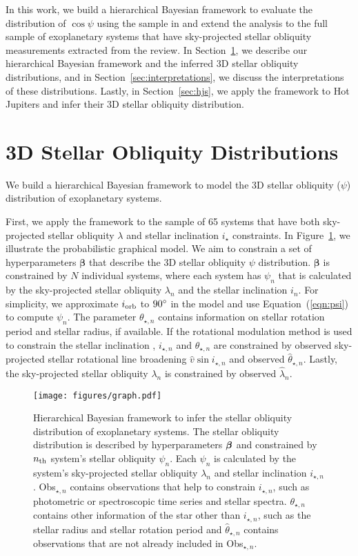 \documentclass[twocolumn,times]{aastex631}
\newcommand{\numistar}{65\xspace}
\begin{document}
In this work, we build a hierarchical Bayesian framework to evaluate the distribution of $\cos{\psi}$ using the sample in \cite{Albrecht21} and extend the analysis to the full sample of exoplanetary systems that have sky-projected stellar obliquity measurements extracted from the \cite{Albrecht22} review.
In Section~\ref{sec:hbm}, we describe our hierarchical Bayesian framework and the inferred 3D stellar obliquity distributions, and in Section~\ref{sec:interpretations}, we discuss the interpretations of these distributions. Lastly, in Section~\ref{sec:hjs}, we apply the framework to Hot Jupiters and infer their 3D stellar obliquity distribution.

\section{3D Stellar Obliquity Distributions} \label{sec:hbm}
We build a hierarchical Bayesian framework to model the 3D stellar obliquity ($\psi$) distribution of exoplanetary systems.

First, we apply the framework to the sample of \numistar systems that have both sky-projected stellar obliquity $\lambda$ and stellar inclination $i_\star$ constraints.
In Figure~\ref{fig:graph}, we illustrate the probabilistic graphical model. We aim to constrain a set of hyperparameters $\bm{\beta}$ that describe the 3D stellar obliquity $\psi$ distribution. $\bm{\beta}$ is constrained by $N$ individual systems, where each system has $\psi_n$ that is calculated by the sky-projected stellar obliquity $\lambda_n$ and the stellar inclination $i_n$. For simplicity, we approximate $i_{\rm orb}$ to $90\mbox{$^\circ$}$ in the model and use Equation~(\ref{eqn:psi}) to compute $\psi_n$. 
The parameter $\theta_{\star, n}$ contains information on stellar rotation period and stellar radius, if available.
If the rotational modulation method is used to constrain the stellar inclination \citep[e.g.,][]{Masuda20}, $i_{\star,n}$ and $\theta_{\star,n}$ are constrained by observed sky-projected stellar rotational line broadening $\hat{v}\sin{i_{\star,n}}$ and observed $\hat{\theta}_{\star,n}$. Lastly, the sky-projected stellar obliquity $\lambda_n$ is constrained by observed $\hat{\lambda}_n$.

\begin{figure}
    \texttt{[image: figures/graph.pdf]}
    \caption{Hierarchical Bayesian framework to infer the stellar obliquity distribution of exoplanetary systems. The stellar obliquity distribution is described by hyperparameters $\vb*{\beta}$ and constrained by $n_{\rm th}$ system's stellar obliquity $\psi_n$. Each $\psi_n$ is calculated by the system's sky-projected stellar obliquity $\lambda_n$ and stellar inclination $i_{\star, n}$. Obs$_{\star,n}$ contains observations that help to constrain $i_{\star,n}$, such as photometric or spectroscopic time series and stellar spectra. $\theta_{\star, n}$ contains other information of the star other than $i_{\star, n}$, such as the stellar radius and stellar rotation period and $\hat{\theta}_{\star,n}$ contains observations that are not already included in Obs$_{\star,n}$.}
    \label{fig:graph}
\end{figure}
\end{document}
